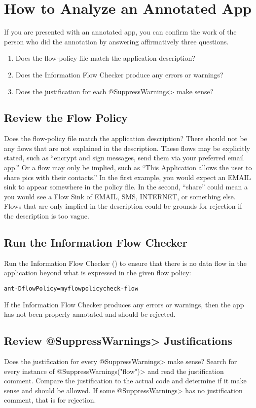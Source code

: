 \htmlhr
\chapter{How to Analyze an Annotated App\label{analyze-annotated-app}}

If you are presented with an annotated app, you can confirm the work of the
person who did the annotation by answering affirmatively three questions.

\begin{enumerate}
\item Does the flow-policy file match the application description?
\item Does the Information Flow Checker produce any errors or warnings?
\item Does the justification for each \<@SuppressWarnings> make sense?
\end{enumerate}

\section{Review the Flow Policy}
Does the flow-policy file match the application description? There should
not be any flows that are not explained in the description.  These flows
may be explicitly stated, such as ``encrypt and sign messages, send them
via your preferred email app.''  Or a flow may only be implied, such as
``This Application allows the user to share pics with their contacts.''  In
the first example, you would expect an EMAIL sink to appear somewhere in
the policy file. In the second, ``share'' could mean a you would see a Flow
Sink of EMAIL, SMS, INTERNET, or something else.  Flows that are only
implied in the description could be grounds for rejection if the
description is too vague.

\section{Run the Information Flow Checker}

Run the Information Flow Checker () to ensure that there is no
data flow in the application beyond what is expressed in the given flow
policy:

\begin{alltt}
ant -DflowPolicy=myflowpolicy check-flow
\end{alltt}

If the Information Flow Checker produces any errors or warnings, then the app has not
been properly annotated and should be rejected.



\section{Review \<@SuppressWarnings> Justifications}
Does the justification for every \<@SuppressWarnings> make sense? Search
for every instance of \<@SuppressWarnings("flow")> and read the
justification comment.  Compare the justification to the actual code and
determine if it make sense and should be allowed.  If some \<@SuppressWarnings> has
no justification comment, that is for rejection.
  

